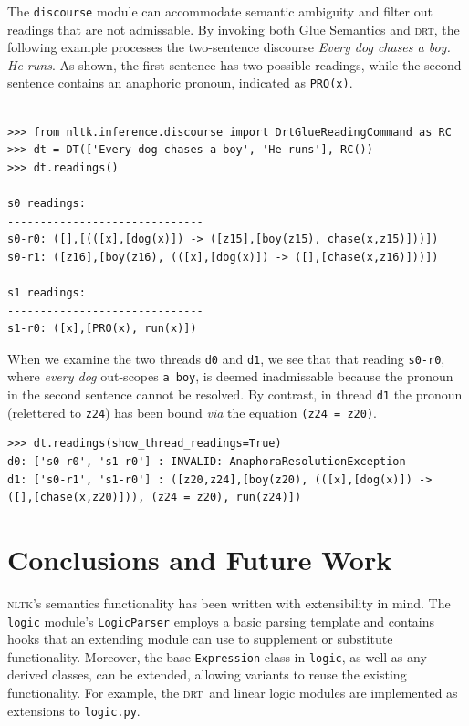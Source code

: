 \documentclass[11pt, a4paper]{article}
\newcommand{\DRT}{\textsc{drt}}
\newcommand{\NLTK}{\textsc{nltk}}
\begin{document}
The \texttt{discourse} module can accommodate semantic 
ambiguity and filter out readings that are not admissable.
By invoking both Glue Semantics and \DRT, the following example processes the 
two-sentence discourse \textit{Every dog chases a boy.  He runs}.  As
shown, the first sentence has two possible readings, while 
the second sentence contains an anaphoric pronoun, indicated as \texttt{PRO(x)}.
\begin{Verbatim}[baselinestretch=.5]

>>> from nltk.inference.discourse import DrtGlueReadingCommand as RC
>>> dt = DT(['Every dog chases a boy', 'He runs'], RC())
>>> dt.readings()

s0 readings:
------------------------------
s0-r0: ([],[(([x],[dog(x)]) -> ([z15],[boy(z15), chase(x,z15)]))])
s0-r1: ([z16],[boy(z16), (([x],[dog(x)]) -> ([],[chase(x,z16)]))])

s1 readings:
------------------------------
s1-r0: ([x],[PRO(x), run(x)])
\end{Verbatim}
When we examine the two threads \texttt{d0} and \texttt{d1}, we see
that that reading \texttt{s0-r0}, where \textit{every dog} out-scopes
\texttt{a boy}, is deemed inadmissable because the pronoun in the
second sentence cannot be resolved.  By contrast, in thread \texttt{d1} the
pronoun (relettered to \texttt{z24}) has been bound \textit{via} the
equation \texttt{(z24 = z20)}.  %
\begin{Verbatim}
>>> dt.readings(show_thread_readings=True)
d0: ['s0-r0', 's1-r0'] : INVALID: AnaphoraResolutionException
d1: ['s0-r1', 's1-r0'] : ([z20,z24],[boy(z20), (([x],[dog(x)]) -> 
([],[chase(x,z20)])), (z24 = z20), run(z24)])
\end{Verbatim}

\section{Conclusions and Future Work}
\NLTK's semantics functionality has been written with extensibility in
mind.  The \texttt{logic} module's \texttt{LogicParser}
employs a basic parsing template and contains hooks that an extending
module can use to supplement or substitute functionality.  Moreover, the
base \texttt{Expression} class in \texttt{logic}, as well as any
derived classes, can be extended, allowing variants to reuse the
existing functionality.  For example, the \DRT\ and linear logic modules
are implemented as extensions to \texttt{logic.py}.
\end{document}

